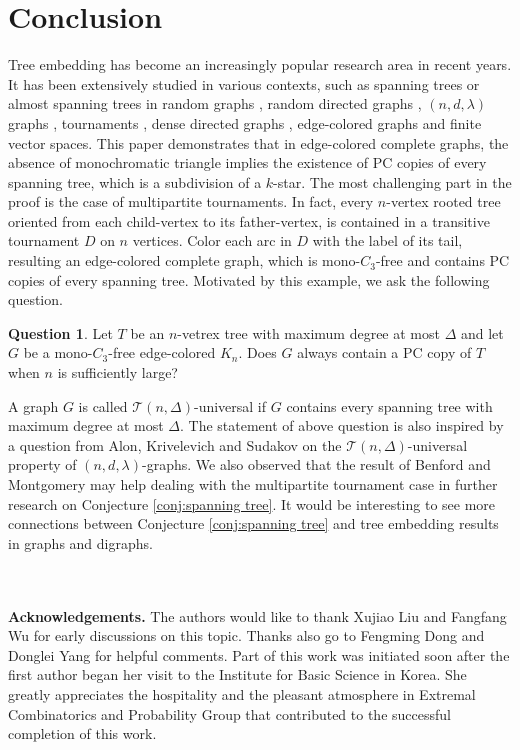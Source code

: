 \documentclass[11pt,a4paper]{article}
\theoremstyle{definition}
\newtheorem{question}{Question}
\begin{document}
\section{Conclusion}\label{sec:conclusion}
Tree embedding has become an increasingly popular research area in recent years. It has been extensively studied in various contexts, such as spanning trees or almost spanning trees in random graphs \cite{montgomery_spanning_2019}, random directed graphs \cite{montgomery_spanning_nodate}, $(n,d,\lambda)$ graphs \cite{han_spanning_2023,hyde_spanning_nodate}, tournaments \cite{benford_trees_2022,benford_trees_2022-1}, dense directed graphs \cite{kathapurkar_spanning_2022}, edge-colored graphs \cite{glock_decompositions_2021} and finite vector spaces\cite{chakraborti_almost_2024}.
This paper demonstrates that in edge-colored complete graphs, the absence of monochromatic triangle implies the existence of PC copies of every spanning tree, which is a subdivision of a $k$-star. The most challenging part in the proof is the case of multipartite tournaments. In fact, every $n$-vertex rooted tree oriented from each child-vertex to its father-vertex, is contained in a transitive tournament $D$ on $n$ vertices. Color each arc in $D$ with the label of its tail, resulting an edge-colored complete graph, which is mono-$C_3$-free and contains PC copies of every spanning tree. Motivated by this example, we ask the following question.
\begin{question}
Let $T$ be an $n$-vetrex tree with maximum degree at most $\Delta$ and let $G$ be a mono-$C_3$-free edge-colored $K_n$. Does $G$ always contain a PC copy of $T$ when $n$ is sufficiently large?
\end{question}
A graph $G$ is called $\mathcal{T}(n,\Delta)$-universal if $G$ contains every spanning tree with maximum degree at most $\Delta$. The statement of above question is also inspired by a question from Alon, Krivelevich and Sudakov\cite{alon_embedding_2007} on the $\mathcal{T}(n,\Delta)$-universal property of $(n,d,\lambda)$-graphs. We also observed that the result of Benford and Montgomery\cite{benford_trees_2022-1} may help dealing with the multipartite tournament case in further research on Conjecture \ref{conj:spanning tree}. It would be interesting to see more connections between Conjecture \ref{conj:spanning tree} and tree embedding results in graphs and digraphs.

~\\
~\\
{\bf Acknowledgements.} The authors would like to thank Xujiao Liu and Fangfang Wu for early discussions on this topic. Thanks also go to Fengming Dong and Donglei Yang for helpful comments. Part of this work was initiated soon after the first author began her visit to the Institute for Basic Science in Korea. She greatly appreciates the hospitality and the pleasant atmosphere in Extremal Combinatorics and Probability Group that contributed to the successful completion of this work.


\end{document}
